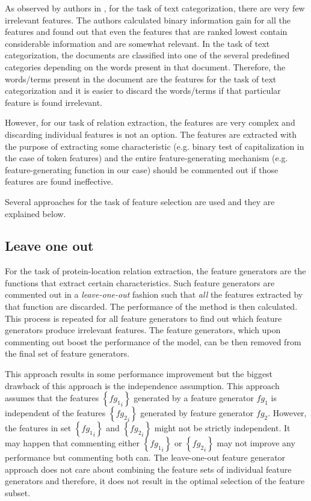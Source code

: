 As observed by authors in \cite{joachims1998text}, for the task of text categorization, there are very few irrelevant features. The authors calculated binary information gain for all the features and found out that even the features that are ranked lowest contain considerable information and are somewhat relevant. In the task of text categorization, the documents are classified into one of the several predefined categories depending on the words present in that document. Therefore, the words/terms present in the document are the features for the task of text categorization and it is easier to discard the words/terms if that particular feature is found irrelevant.

However, for our task of relation extraction, the features are very complex and discarding individual features is not an option. The features are extracted with the purpose of extracting some characteristic (e.g. binary test of capitalization in the case of token features) and the entire feature-generating mechanism (e.g. feature-generating function in our case) should be commented out if those features are found ineffective.

Several approaches for the task of feature selection are used and they are explained below.

\subsection{Leave one out}\label{subsec:LeaveOneOut}

For the task of protein-location relation extraction, the feature generators are the functions that extract certain characteristics. Such feature generators are commented out in a \emph{leave-one-out} fashion such that \emph{all} the features extracted by that function are discarded. The performance of the method is then calculated. This process is repeated for all feature generators to find out which feature generators produce irrelevant features. The feature generators, which upon commenting out boost the performance of the model, can be then removed from the final set of feature generators.

This approach results in some performance improvement but the biggest drawback of this approach is the independence assumption. This approach assumes that the features $\left\lbrace {fg_1}_i \right\rbrace$ generated by a feature generator $fg_1$ is independent of the features $\left\lbrace {fg_2}_i \right\rbrace$ generated by feature generator $fg_2$. However, the features in set $\left\lbrace {fg_1}_i \right\rbrace$ and $\left\lbrace {fg_2}_i \right\rbrace$ might not be strictly independent. It may happen that commenting either $\left\lbrace {fg_1}_i \right\rbrace$ or $\left\lbrace {fg_2}_i \right\rbrace$ may not improve any performance but commenting both can. The leave-one-out feature generator approach does not care about combining the feature sets of individual feature generators and therefore, it does not result in the optimal selection of the feature subset.

